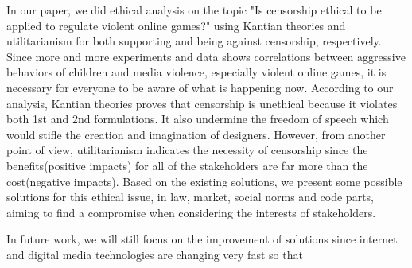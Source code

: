 
In our paper, we did ethical analysis on the topic "Is censorship ethical to be applied to regulate violent online games?" using Kantian theories and utilitarianism for both supporting and being against censorship, respectively. Since more and more experiments and data shows correlations between aggressive behaviors of children and media violence, especially violent online games, it is necessary for everyone to be aware of what is happening now. According to our analysis, Kantian theories proves that censorship is unethical because it violates both 1st and 2nd formulations. It also undermine the freedom of speech which would stifle the creation and imagination of designers. However, from another point of view, utilitarianism indicates the necessity of censorship since the benefits(positive impacts) for all of the stakeholders are far more than the cost(negative impacts). Based on the existing solutions, we present some possible solutions for this ethical issue, in law, market, social norms and code parts, aiming to find a compromise when considering the interests of stakeholders.

In future work, we will still focus on the improvement of solutions since internet and digital media technologies are changing very fast so that  